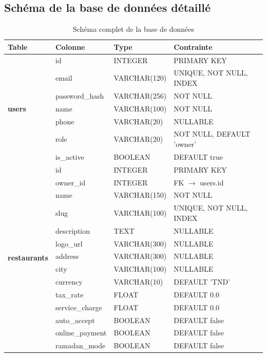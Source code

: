 \documentclass[12pt,a4paper]{report}
\begin{document}
\subsection{Schéma de la base de données détaillé}

\begin{table}[H]
    \centering
    \caption{Schéma complet de la base de données}
    \label{tab:schema}
    \small
    \begin{tabularx}{\textwidth}{llXl}
        \toprule
        \textbf{Table} & \textbf{Colonne} & \textbf{Type} & \textbf{Contrainte} \\
        \midrule
        \multirow{7}{*}{\textbf{users}} & id & INTEGER & PRIMARY KEY \\
        & email & VARCHAR(120) & UNIQUE, NOT NULL, INDEX \\
        & password\_hash & VARCHAR(256) & NOT NULL \\
        & name & VARCHAR(100) & NOT NULL \\
        & phone & VARCHAR(20) & NULLABLE \\
        & role & VARCHAR(20) & NOT NULL, DEFAULT 'owner' \\
        & is\_active & BOOLEAN & DEFAULT true \\
        \midrule
        \multirow{15}{*}{\textbf{restaurants}} & id & INTEGER & PRIMARY KEY \\
        & owner\_id & INTEGER & FK $\rightarrow$ users.id \\
        & name & VARCHAR(150) & NOT NULL \\
        & slug & VARCHAR(100) & UNIQUE, NOT NULL, INDEX \\
        & description & TEXT & NULLABLE \\
        & logo\_url & VARCHAR(300) & NULLABLE \\
        & address & VARCHAR(300) & NULLABLE \\
        & city & VARCHAR(100) & NULLABLE \\
        & currency & VARCHAR(10) & DEFAULT 'TND' \\
        & tax\_rate & FLOAT & DEFAULT 0.0 \\
        & service\_charge & FLOAT & DEFAULT 0.0 \\
        & auto\_accept & BOOLEAN & DEFAULT false \\
        & online\_payment & BOOLEAN & DEFAULT false \\
        & ramadan\_mode & BOOLEAN & DEFAULT false \\

\end{tabularx}
\end{table}
\end{document}
